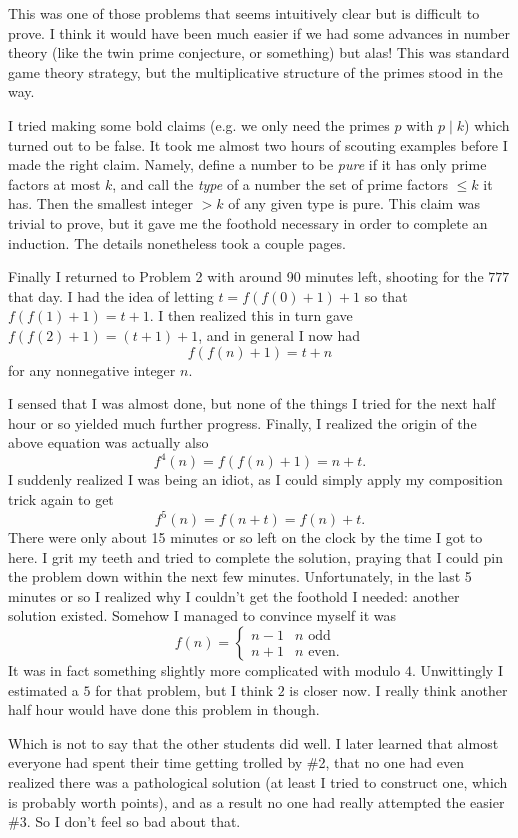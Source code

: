 \documentclass[11pt]{scrreprt}
\begin{document}
This was one of those problems that seems intuitively clear but is difficult to prove.
I think it would have been much easier if we had some advances in number theory
(like the twin prime conjecture, or something) but alas!
This was standard game theory strategy, but the multiplicative structure of the primes stood in the way.

I tried making some bold claims (e.g.
we only need the primes $p$ with $p \mid k$) which turned out to be false.
It took me almost two hours of scouting examples before I made the right claim.
Namely, define a number to be \emph{pure} if it has only prime factors at most $k$,
and call the \emph{type} of a number the set of prime factors $\le k$ it has.
Then the smallest integer $> k$ of any given type is pure.
This claim was trivial to prove, but it gave me the foothold necessary in order to complete an induction.
The details nonetheless took a couple pages.

Finally I returned to Problem 2 with around 90 minutes left, shooting for the $777$ that day.
I had the idea of letting $t = f(f(0)+1)+1$ so that
$f(f(1)+1) = t+1$. I then realized this in turn gave $f(f(2)+1) = (t+1)+1$, and in general I now had
\[ f\left( f(n)+1 \right) = t+n \]
for any nonnegative integer $n$.

I sensed that I was almost done,
but none of the things I tried for the next half hour or so yielded much further progress.
Finally, I realized the origin of the above equation was actually also
\[ f^4(n) = f(f(n)+1) = n+t. \]
I suddenly realized I was being an idiot, as I could simply apply my composition trick again to get
\[ f^5(n) = f(n+t) = f(n) + t. \]
There were only about 15 minutes or so left on the clock by the time I got to here.
I grit my teeth and tried to complete the solution,
praying that I could pin the problem down within the next few minutes.
Unfortunately, in the last 5 minutes or so I realized why I couldn't get the foothold I needed:
another solution existed.
Somehow I managed to convince myself it was
\[ f(n) =
  \begin{cases}
    n-1 & \text{$n$ odd} \\
    n+1 & \text{$n$ even}.
  \end{cases} \]
It was in fact something slightly more complicated with modulo $4$.
Unwittingly I estimated a $5$ for that problem, but I think $2$ is closer now.
I really think another half hour would have done this problem in though.

Which is not to say that the other students did well.
I later learned that almost everyone had spent their time getting trolled by \#2,
that no one had even realized there was a pathological solution (at least I tried to construct one,
which is probably worth points), and as a result no one had really attempted the easier \#3.
So I don't feel so bad about that.
\end{document}

